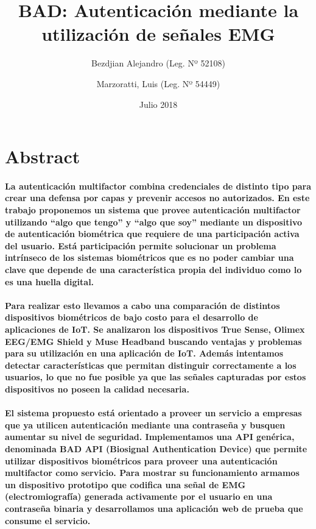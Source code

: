 \documentclass{article}
\title{BAD: Autenticación mediante la utilización de señales EMG}
\author{
    Bezdjian Alejandro (Leg. Nº 52108) \\
    \and
    Marzoratti, Luis (Leg. Nº 54449)
}
\date{Julio 2018}
\begin{document}
\maketitle
\thispagestyle{empty}
\clearpage
\tableofcontents
\clearpage

\section{Abstract}

\paragraph{
La autenticación multifactor combina credenciales de distinto tipo para crear una defensa por capas y prevenir accesos no autorizados. En este trabajo proponemos un sistema que provee autenticación multifactor utilizando ``algo que tengo'' y ``algo que soy'' mediante un dispositivo de autenticación biométrica que requiere de una participación activa del usuario. Está participación permite solucionar un problema intrínseco de los sistemas biométricos que es no poder cambiar una clave que depende de una característica propia del individuo como lo es una huella digital.
}
\paragraph{
Para realizar esto llevamos a cabo una comparación de distintos dispositivos biométricos de bajo costo para el desarrollo de aplicaciones de IoT. Se analizaron los dispositivos True Sense, Olimex EEG/EMG Shield y Muse Headband buscando ventajas y problemas para su utilización en una aplicación de IoT. Además intentamos detectar características que permitan distinguir correctamente a los usuarios, lo que no fue posible ya que las señales capturadas por estos dispositivos no poseen la calidad necesaria.
}
\paragraph{
El sistema propuesto está orientado a proveer un servicio a empresas que ya utilicen autenticación mediante una contraseña y busquen aumentar su nivel de seguridad. Implementamos una API genérica, denominada BAD API (Biosignal Authentication Device) que permite utilizar dispositivos biométricos para proveer una autenticación multifactor como servicio. Para mostrar su funcionamiento armamos un dispositivo prototipo que codifica una señal de EMG (electromiografía) generada activamente por el usuario en una contraseña binaria y desarrollamos una aplicación web de prueba que consume el servicio.
}
\end{document}
